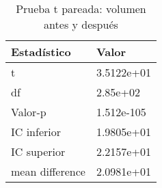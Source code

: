 \begin{table}[ht]
\centering
\caption{Prueba t pareada: volumen antes y después} 
\label{tab:prueba_t_volumen}
\begin{tabular}{ll}
  \hline
Estadístico & Valor \\ 
  \hline
t & 3.5122e+01 \\ 
  df & 2.85e+02 \\ 
  Valor-p & 1.512e-105 \\ 
  IC inferior & 1.9805e+01 \\ 
  IC superior & 2.2157e+01 \\ 
  mean difference & 2.0981e+01 \\ 
   \hline
\end{tabular}
\end{table}
